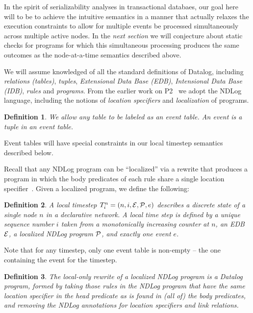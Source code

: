 \documentclass{article}
\newtheorem{defn}{Definition}
\begin{document}
In the spirit of serializability analyses in transactional databaes,
our goal here will to be to achieve the intuitive semantics in a
manner that actually relaxes the execution constraints to allow for
multiple events be processed simultaneously across multiple active
nodes.  In the {\em next section} we will conjecture about static
checks for programs for which this simultaneous processing produces
the same outcomes as the node-at-a-time semantics described above.


We will assume knowledged of all the standard definitions of Datalog,
including {\em relations (tables)}, {\em tuples}, {\em Extensional
  Data Base (EDB)}, {\em Intensional Data Base (IDB)}, {\em rules} and
{\em programs}.  From the earlier work on P2~\cite{loo-sigmod06} we
adopt the NDLog language, including the notions of {\em location
  specifiers} and {\em localization} of programs.

\begin{defn}
  We allow any table to be labeled as an {\em event table}.  An {\em
    event} is a tuple in an event table.
\end{defn}
Event tables will have special constraints in our local timestep
semantics described below.

Recall that any NDLog program can be ``localized'' via a rewrite that
produces a program in which the body predicates of each rule share a
single location specifier~\cite{loo-sigmod06}.  Given a localized
program, we define the following:
\begin{defn}
  A {\em local timestep} $T^n_i = (n, i, {\cal E}, {\cal P}, e)$
  describes a discrete state of a single node $n$ in a declarative
  network.  A local time step is defined by a unique sequence number
  $i$ taken from a monotonically increasing counter at $n$, an EDB
  ${\cal E}$, a localized NDLog program ${\cal P}$, and exactly one
  event $e$.
\end{defn}
Note that for any timestep, only one event table is non-empty -- the
one containing the event for the timestep.


\begin{defn}
  The {\em local-only rewrite} of a localized NDLog program is a
  Datalog program, formed by taking those rules in the NDLog program
  that have the same location specifier in the head predicate as is
  found in (all of) the body predicates, and removing the NDLog
  annotations for location specifiers and link relations.
\end{defn}
\end{document}
